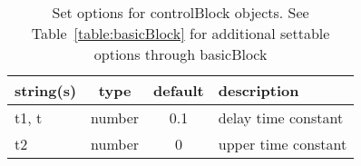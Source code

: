 \begin{table}[ht]
\centering
\begin{tabular}{p{5cm} c c p{7cm}}
\hline
string(s) & type & default & description \\
\hline
t1, t & number & 0.1 & delay time constant\\
t2 & number & 0 & upper time constant\\
\hline
\end{tabular}
\caption{Set options for controlBlock objects. See Table~\ref{table:basicBlock} for additional settable options through basicBlock}
\label{table:controlBlock}
\end{table}
